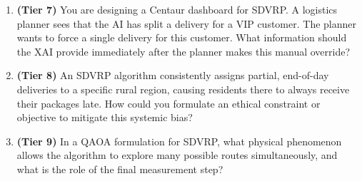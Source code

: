 \documentclass{article}
\begin{document}
\begin{enumerate}
    \item \textbf{(Tier 7)} You are designing a Centaur dashboard for SDVRP. A logistics planner sees that the AI has split a delivery for a VIP customer. The planner wants to force a single delivery for this customer. What information should the XAI provide immediately after the planner makes this manual override?
    
    \item \textbf{(Tier 8)} An SDVRP algorithm consistently assigns partial, end-of-day deliveries to a specific rural region, causing residents there to always receive their packages late. How could you formulate an ethical constraint or objective to mitigate this systemic bias?
    
    \item \textbf{(Tier 9)} In a QAOA formulation for SDVRP, what physical phenomenon allows the algorithm to explore many possible routes simultaneously, and what is the role of the final measurement step?
\end{enumerate}
\end{document}
